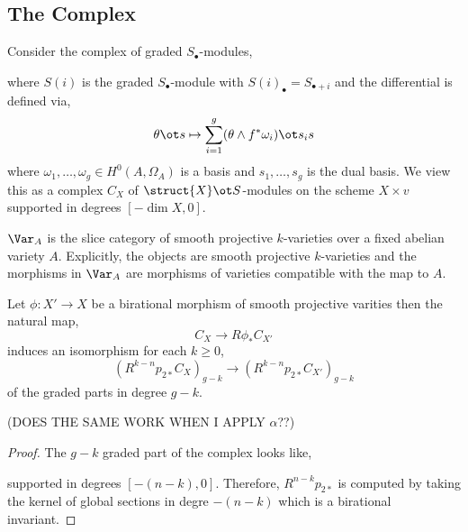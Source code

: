 \documentclass[12pt]{article}
\begin{document}
\subsection{The Complex}

Consider the complex of graded $S_\bullet$-modules,
\begin{center}
\end{center}
where $S(i)$ is the graded $S_\bullet$-module with $S(i)_{\bullet} = S_{\bullet + i}$ and the differential is defined via,
\[ \theta \ot s \mapsto \sum_{i = 1}^g (\theta \wedge f^* \omega_i) \ot s_i s \]
where $\omega_1, \dots, \omega_g \in H^0(A, \Omega_A)$ is a basis and $s_1, \dots, s_g$ is the dual basis. We view this as a complex $C_X$ of $\struct{X} \ot S$-modules on the scheme $X \times v$ supported in degrees $[-\dim{X}, 0]$.

\begin{defn}
$\Var_A$ is the slice category of smooth projective $k$-varieties over a fixed abelian variety $A$. Explicitly, the objects are smooth projective $k$-varieties and the morphisms in $\Var_A$ are morphisms of varieties compatible with the map to $A$.
\end{defn}

\begin{prop}
Let $\phi :  X' \to X$ be a birational morphism of smooth projective varities then the natural map,
\[ C_{X} \to R \phi_* C_{X'} \]
induces an isomorphism for each $k \ge 0$,
\[ (R^{k-n} p_{2 *} C_{X})_{g-k} \to (R^{k-n} p_{2 *} C_{X'})_{g-k} \]
of the graded parts in degree $g-k$.
\end{prop}

(DOES THE SAME WORK WHEN I APPLY $\alpha$??)

\begin{proof}
The $g-k$ graded part of the complex looks like,
\begin{center}
\end{center}
supported in degrees $[-(n-k), 0]$. Therefore, $R^{n-k} p_{2*}$ is computed by taking the kernel of global sections in degre $-(n-k)$ which is a birational invariant. 
\end{proof}
\end{document}

